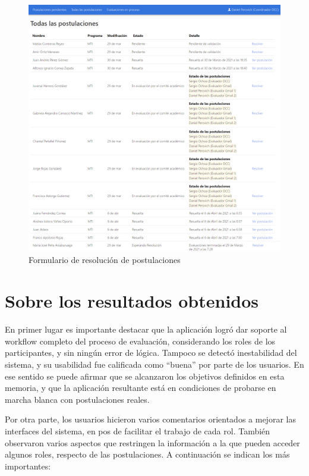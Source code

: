 \begin{figure}[!ht]
    \begin{center}
        \includegraphics[scale=0.23]{imagenes/05-estado-final-evaluaciones.png}
    \end{center}
    \caption{Formulario de resolución de postulaciones}
    \label{fig:estado-final-evaluaciones}
\end{figure}

\section{Sobre los resultados obtenidos}

En primer lugar es importante destacar que la aplicación logró dar soporte al
workflow completo del proceso de evaluación, considerando los roles de los
participantes, y sin ningún error de lógica. Tampoco se detectó inestabilidad
del sistema, y su usabilidad fue calificada como “buena” por parte de los
usuarios. En ese sentido se puede afirmar que se alcanzaron los objetivos
definidos en esta memoria, y que la aplicación resultante está en condiciones de
probarse en marcha blanca con postulaciones reales.

Por otra parte, los usuarios hicieron varios comentarios orientados a mejorar
las interfaces del sistema, en pos de facilitar el trabajo de cada rol. También
observaron varios aspectos que restringen la información a la que pueden acceder
algunos roles, respecto de las postulaciones. A continuación se indican los más
importantes:

